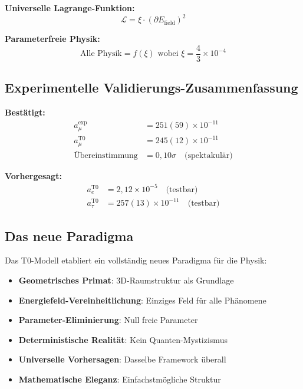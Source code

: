 \documentclass[12pt,a4paper]{report}
\begin{document}
	\textbf{Universelle Lagrange-Funktion:}
	\begin{equation}
		\mathcal{L} = \xi \cdot (\partial E_{\text{field}})^2
	\end{equation}
	
	\textbf{Parameterfreie Physik:}
	\begin{equation}
		\boxed{\text{Alle Physik} = f(\xi) \text{ wobei } \xi = \frac{4}{3} \times 10^{-4}}
	\end{equation}
	
	\subsection{Experimentelle Validierungs-Zusammenfassung}
	\label{subsec:experimental_summary}
	
	\textbf{Bestätigt:}
	\begin{align}
		a_\mu^{\text{exp}} &= 251(59) \times 10^{-11} \\
		a_\mu^{\text{T0}} &= 245(12) \times 10^{-11} \\
		\text{Übereinstimmung} &= 0,10\sigma \quad \text{(spektakulär)}
	\end{align}
	
	\textbf{Vorhergesagt:}
	\begin{align}
		a_e^{\text{T0}} &= 2,12 \times 10^{-5} \quad \text{(testbar)} \\
		a_\tau^{\text{T0}} &= 257(13) \times 10^{-11} \quad \text{(testbar)}
	\end{align}
	
	\subsection{Das neue Paradigma}
	\label{subsec:new_paradigm}
	
	Das T0-Modell etabliert ein vollständig neues Paradigma für die Physik:
	
	\begin{itemize}
		\item \textbf{Geometrisches Primat}: 3D-Raumstruktur als Grundlage
		\item \textbf{Energiefeld-Vereinheitlichung}: Einziges Feld für alle Phänomene
		\item \textbf{Parameter-Eliminierung}: Null freie Parameter
		\item \textbf{Deterministische Realität}: Kein Quanten-Mystizismus
		\item \textbf{Universelle Vorhersagen}: Dasselbe Framework überall
		\item \textbf{Mathematische Eleganz}: Einfachstmögliche Struktur
	\end{itemize}
	
\end{document}

